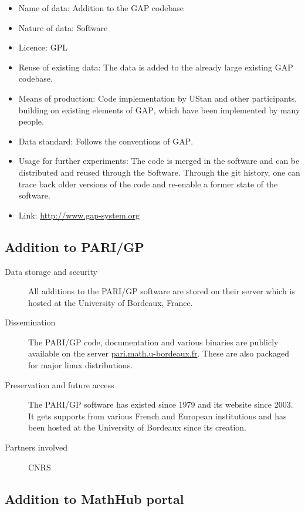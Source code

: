\documentclass[12pt]{article}
\newcommand{\software}[1]{\textsc{#1}\xspace}
\newcommand{\GAP}{\software{GAP}}
\newcommand{\PARIGP}{\software{PARI/GP}}
\begin{document}
\begin{itemize}


\item{Name of data:} Addition to the \GAP codebase
\item{Nature of data:} Software
\item{Licence:} GPL
\item{Reuse of existing data:} The data is added to the already large existing \GAP codebase.
\item{Means of production:} Code implementation by UStan and other
  participants, building on existing elements of \GAP, which have been
  implemented by many people.
\item{Data standard:} Follows the conventions of \GAP.
\item{Usage for further experiments:} The code is merged in the software and can be distributed and reused through the Software. Through the git history,
one can trace back older versions of the code and re-enable a former state of the software.
\item {Link:} \href{http://www.gap-system.org}{http://www.gap-system.org}


\end{itemize}

\subsection{Addition to \PARIGP}

\begin{description}
\item[Data storage and security] All additions to the \PARIGP software are stored on their server which is hosted at the University of Bordeaux, France.
\item[Dissemination] The \PARIGP code, documentation and various binaries are publicly available on the server \href{http://pari.math.u-bordeaux.fr/}{pari.math.u-bordeaux.fr}. These are also packaged for major linux distributions.
\item[Preservation and future access] The \PARIGP software has existed
  since 1979 and its website since 2003. It gets supports from various
  French and European institutions and has been hosted at the University of Bordeaux since its creation.
\item[Partners involved] CNRS
\end{description}


\subsection{Addition to MathHub portal}
\end{document}
